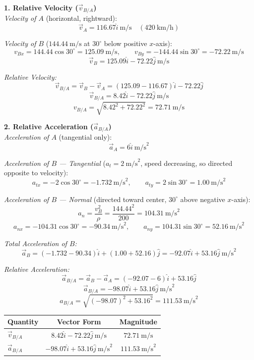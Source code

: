\documentclass[12pt,a3paper]{article}
\begin{document}
\begin{enumerate}
\begin{tcolorbox}[enhanced,breakable,ansbox,colback=cF!4,colframe=cF,
  boxrule=0.8pt,arc=5pt,
  title={\textbf{Solution}},fonttitle=\bfseries\color{white},
  colbacktitle=cF]
\textbf{1. Relative Velocity ($\vec{v}_{B/A}$)}\\[4pt]

\textit{Velocity of $A$} (horizontal, rightward):
\[
  \vec{v}_A = 116.67\hat{i}\ \text{m/s}
  \quad \left(420\ \text{km/h}\right)
\]

\textit{Velocity of $B$} ($144.44\ \text{m/s}$ at $30^\circ$ below positive $x$-axis):
\[
  v_{Bx} = 144.44\cos30^\circ = 125.09\ \text{m/s}, \qquad
  v_{By} = -144.44\sin30^\circ = -72.22\ \text{m/s}
\]
\[
  \vec{v}_B = 125.09\hat{i} - 72.22\hat{j}\ \text{m/s}
\]

\textit{Relative Velocity:}
\[
  \vec{v}_{B/A} = \vec{v}_B - \vec{v}_A
               = (125.09 - 116.67)\hat{i} - 72.22\hat{j}
\]
\[
  \vec{v}_{B/A} = 8.42\hat{i} - 72.22\hat{j}\ \text{m/s}
\]
\[
  \boxed{v_{B/A} = \sqrt{8.42^2 + 72.22^2} = 72.71\ \text{m/s}}
\]

\medskip
\textbf{2. Relative Acceleration ($\vec{a}_{B/A}$)}\\[4pt]

\textit{Acceleration of $A$} (tangential only):
\[
  \vec{a}_A = 6\hat{i}\ \text{m/s}^2
\]

\textit{Acceleration of $B$ — Tangential} ($a_t = 2\ \text{m/s}^2$, speed decreasing,
so directed opposite to velocity):
\[
  a_{tx} = -2\cos30^\circ = -1.732\ \text{m/s}^2, \qquad
  a_{ty} = 2\sin30^\circ = 1.00\ \text{m/s}^2
\]

\textit{Acceleration of $B$ — Normal} (directed toward center,
$30^\circ$ above negative $x$-axis):
\[
  a_n = \frac{v_B^2}{\rho} = \frac{144.44^2}{200} = 104.31\ \text{m/s}^2
\]
\[
  a_{nx} = -104.31\cos30^\circ = -90.34\ \text{m/s}^2, \qquad
  a_{ny} = 104.31\sin30^\circ = 52.16\ \text{m/s}^2
\]

\textit{Total Acceleration of $B$:}
\[
  \vec{a}_B = (-1.732 - 90.34)\hat{i} + (1.00 + 52.16)\hat{j}
            = -92.07\hat{i} + 53.16\hat{j}\ \text{m/s}^2
\]

\textit{Relative Acceleration:}
\[
  \vec{a}_{B/A} = \vec{a}_B - \vec{a}_A
               = (-92.07 - 6)\hat{i} + 53.16\hat{j}
\]
\[
  \vec{a}_{B/A} = -98.07\hat{i} + 53.16\hat{j}\ \text{m/s}^2
\]
\[
  \boxed{a_{B/A} = \sqrt{(-98.07)^2 + 53.16^2} = 111.53\ \text{m/s}^2}
\]

\medskip
\begin{center}
\renewcommand{\arraystretch}{1.4}
\begin{tabular}{lcc}
  \hline
  \textbf{Quantity} & \textbf{Vector Form} & \textbf{Magnitude} \\
  \hline
  $\vec{v}_{B/A}$ &
  $8.42\hat{i} - 72.22\hat{j}\ \text{m/s}$ &
  $72.71\ \text{m/s}$ \\
  $\vec{a}_{B/A}$ &
  $-98.07\hat{i} + 53.16\hat{j}\ \text{m/s}^2$ &
  $111.53\ \text{m/s}^2$ \\
  \hline
\end{tabular}
\end{center}


\end{tcolorbox}
\end{enumerate}
\end{document}
